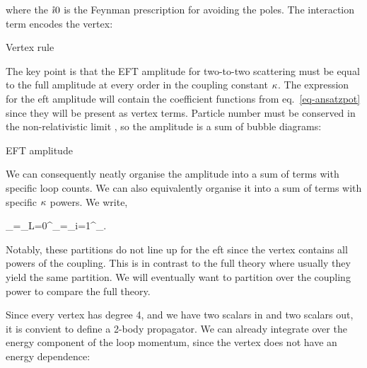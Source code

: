 \documentclass[
  10pt,
  a4paper,
  DIV=11,
  numbers=noendperiod,
  twoside]{scrreprt}
\let\[\relax \let\]\relax %
\DeclareRobustCommand{\[}{\begin{equation}}
\DeclareRobustCommand{\]}{\end{equation}}
\begin{document}
where the \(\mathring{\imath} 0\) is the Feynman prescription for avoiding the poles.
The interaction term encodes the vertex:

\hypertarget{fig-vertex}{}
{
\makeatletter
\def\LT@makecaption#1#2#3{%
  \noalign{\smash{\hbox{\kern\textwidth\rlap{\kern\marginparsep
  \parbox[t]{\marginparwidth}{%
    \footnotesize{%
      \vspace{(1.1\baselineskip)}
    #1{#2: }\ignorespaces #3}}}}}}%
    }
\makeatother



\label{fig-vertex}Vertex rule

}

The key point is that the EFT amplitude for two-to-two scattering must
be equal to the full amplitude at every order in the coupling constant
\(\kappa\). The expression for the \gls{eft} amplitude will contain
the coefficient functions from eq.~\ref{eq-ansatzpot} since they will be
present as vertex terms. Particle number must be conserved in the
non-relativistic limit , so the amplitude is a sum of bubble diagrams:

\hypertarget{fig-eftampl}{}
{
\makeatletter
\def\LT@makecaption#1#2#3{%
  \noalign{\smash{\hbox{\kern\textwidth\rlap{\kern\marginparsep
  \parbox[t]{\marginparwidth}{%
    \footnotesize{%
      \vspace{(1.1\baselineskip)}
    #1{#2: }\ignorespaces #3}}}}}}%
    }
\makeatother



\label{fig-eftampl}EFT amplitude

}

We can consequently neatly organise the amplitude into a sum of terms
with specific loop counts. We can also equivalently organise it into a
sum of terms with specific \(\kappa\) powers. We write,

\[\ampl_=\sum\limits_{L=0}^\infty{}_=\sum\limits_{i=1}^\infty \ampl[(i)]_.\]

Notably, these partitions do not line up for the \gls{eft} since the
vertex contains all powers of the coupling. This is in contrast to the
full theory where usually they yield the same partition. We will
eventually want to partition over the coupling power to compare the full
theory.

Since every vertex has degree 4, and we have two scalars in and two
scalars out, it is convient to define a 2-body propagator. We can
already integrate over the energy component of the loop momentum, since
the vertex does not have an energy dependence:
\end{document}
